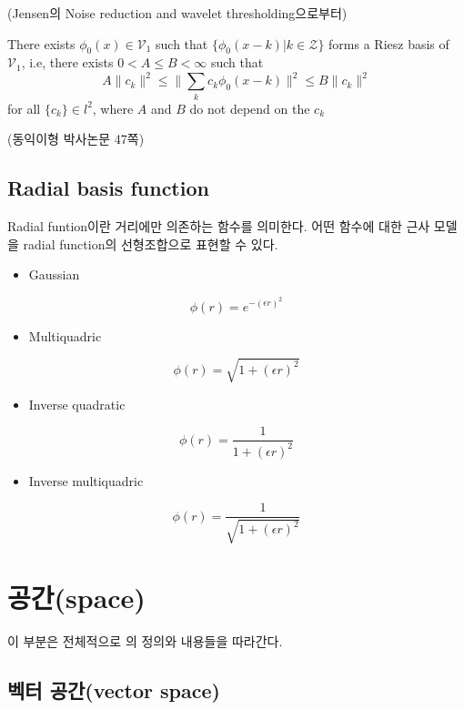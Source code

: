 \documentclass[b5paper,]{scrbook}
\providecommand{\tightlist}{%
  \setlength{\itemsep}{0pt}\setlength{\parskip}{0pt}}
\theoremstyle{plain}
\theoremstyle{definition}
\numberwithin{equation}{section}
\begin{document}
(Jensen의 Noise reduction and wavelet thresholding으로부터)

There exists \(\phi_{0}(x)\in\mathcal{V}_{1}\) such that
\(\{ \phi_{0}(x-k) | k\in\mathcal{Z} \}\) forms a Riesz basis of
\(\mathcal{V}_{1}\), i.e, there exists \(0< A \leq B <\infty\) such that
\[A \| c_{k}\|^{2} \leq \| \sum_{k}c_{k}\phi_{0}(x-k)\|^{2} \leq B \| c_{k} \|^{2}\]
for all \(\{c_{k}\}\in l^{2}\), where \(A\) and \(B\) do not depend on
the \(c_{k}\)

(동익이형 박사논문 47쪽)

\subsection{Radial basis function}\label{radial-basis-function}

Radial funtion이란 거리에만 의존하는 함수를 의미한다. 어떤 함수에 대한
근사 모델을 radial function의 선형조합으로 표현할 수 있다.

\begin{itemize}
\tightlist
\item
  Gaussian
\end{itemize}

\[\phi(r)=e^{-(\epsilon r)^{2}}\]

\begin{itemize}
\tightlist
\item
  Multiquadric
\end{itemize}

\[\phi(r)=\sqrt{1+(\epsilon r)^{2}}\]

\begin{itemize}
\tightlist
\item
  Inverse quadratic
\end{itemize}

\[\phi(r)=\frac{1}{1+(\epsilon r)^{2}}\]

\begin{itemize}
\tightlist
\item
  Inverse multiquadric
\end{itemize}

\[\phi(r)=\frac{1}{\sqrt{1+(\epsilon r)^{2}}}\]

\section{공간(space)}\label{space}

이 부분은 전체적으로 \citep{Shima2016}의 정의와 내용들을 따라간다.

\subsection{벡터 공간(vector space)}\label{-vector-space}
\end{document}
